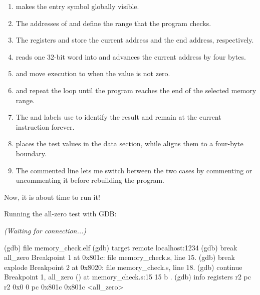 \begin{enumerate}
    \item {} makes the entry symbol globally visible.
    \item The addresses of  and  define the range that the program checks.
    \item The registers  and  store the current address and the end address, respectively.
    \item {} reads one 32-bit word into  and advances the current address by four bytes.
    \item {} and  move execution to  when the value is not zero.
    \item {} and  repeat the loop until the program reaches the end of the selected memory range.
    \item The  and  labels use  to identify the result and remain at the current instruction forever.
    \item {} places the test values in the data section, while  aligns them to a four-byte boundary.
    \item The commented  line lets me switch between the two cases by commenting or uncommenting it before rebuilding the program.
\end{enumerate}

Now, it is about time to run it!

Running the all-zero test with GDB:

\begin{terminal}
\textit{(Waiting for connection...)}
\end{terminal}

\begin{terminal}
(gdb) file memory_check.elf
(gdb) target remote localhost:1234
(gdb) break all_zero
Breakpoint 1 at 0x801c: file memory_check.s, line 15.
(gdb) break explode
Breakpoint 2 at 0x8020: file memory_check.s, line 18.
(gdb) continue
Breakpoint 1, all_zero () at memory_check.s:15
15          b .
(gdb) info registers r2 pc
r2             0x0                 0
pc             0x801c              0x801c <all_zero>
\end{terminal}

